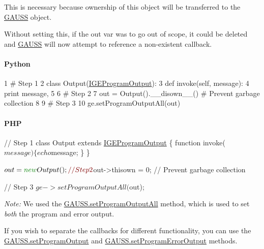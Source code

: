 This is necessary because ownership of this object will be transferred to the \hyperlink{class_g_a_u_s_s}{G\-A\-U\-S\-S} object.

Without setting this, if the {\ttfamily out} var was to go out of scope, it could be deleted and \hyperlink{class_g_a_u_s_s}{G\-A\-U\-S\-S} will now attempt to reference a non-\/existent callback.

\paragraph*{Python}


\begin{DoxyCode}
1 \textcolor{comment}{# Step 1}
2 \textcolor{keyword}{class }Output(\hyperlink{class_i_g_e_program_output}{IGEProgramOutput}):
3     \textcolor{keyword}{def }invoke(self, message):
4         \textcolor{keywordflow}{print} message,
5 
6 \textcolor{comment}{# Step 2}
7 out = Output().\_\_disown\_\_() \textcolor{comment}{# Prevent garbage collection}
8 
9 \textcolor{comment}{# Step 3}
10 ge.setProgramOutputAll(out)
\end{DoxyCode}
 \paragraph*{P\-H\-P}


\begin{DoxyCode}
\textcolor{comment}{// Step 1}
\textcolor{keyword}{class }Output \textcolor{keyword}{extends} \hyperlink{class_i_g_e_program_output}{IGEProgramOutput} \{
    \textcolor{keyword}{function} invoke($message) \{
        echo $message;
    \}
\}

$out = \textcolor{keyword}{new} Output();

\textcolor{comment}{// Step 2}
$out->thisown = 0; \textcolor{comment}{// Prevent garbage collection}

\textcolor{comment}{// Step 3}
$ge->setProgramOutputAll($out);
\end{DoxyCode}


{\itshape Note\-:} We used the \hyperlink{class_g_a_u_s_s_a0b8379c48d677e05aeab433dba66fbb6}{G\-A\-U\-S\-S.\-set\-Program\-Output\-All} method, which is used to set {\itshape both} the program and error output.

If you wish to separate the callbacks for different functionality, you can use the \hyperlink{class_g_a_u_s_s_a7f0dc6b5b307aa06c347f9c6a9fdacab}{G\-A\-U\-S\-S.\-set\-Program\-Output} and \hyperlink{class_g_a_u_s_s_abd75266b2c4075da75163fe95b013ef3}{G\-A\-U\-S\-S.\-set\-Program\-Error\-Output} methods.

